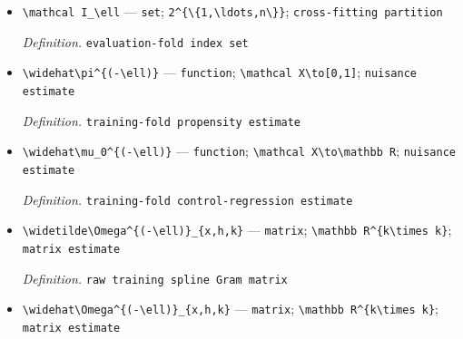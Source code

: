 \documentclass{article}
\begin{document}
\begin{itemize}
  \par\smallskip\noindent\emph{Definition.} \texttt{fold index}
  \item \texttt{\textbackslash{}\allowbreak{}mathcal I\_\allowbreak{}\textbackslash{}\allowbreak{}ell} --- \texttt{set}; \texttt{2\textasciicircum{}\{\textbackslash{}\allowbreak{}\{1,\allowbreak{}\textbackslash{}\allowbreak{}ldots,\allowbreak{}n\textbackslash{}\allowbreak{}\}\allowbreak{}\}\allowbreak{}}; \texttt{cross-\allowbreak{}fitting partition}
  \par\smallskip\noindent\emph{Definition.} \texttt{evaluation-\allowbreak{}fold index set}
  \item \texttt{\textbackslash{}\allowbreak{}widehat\textbackslash{}\allowbreak{}pi\textasciicircum{}\{(-\allowbreak{}\textbackslash{}\allowbreak{}ell)\}\allowbreak{}} --- \texttt{function}; \texttt{\textbackslash{}\allowbreak{}mathcal X\textbackslash{}\allowbreak{}to[0,\allowbreak{}1]}; \texttt{nuisance estimate}
  \par\smallskip\noindent\emph{Definition.} \texttt{training-\allowbreak{}fold propensity estimate}
  \item \texttt{\textbackslash{}\allowbreak{}widehat\textbackslash{}\allowbreak{}mu\_\allowbreak{}0\textasciicircum{}\{(-\allowbreak{}\textbackslash{}\allowbreak{}ell)\}\allowbreak{}} --- \texttt{function}; \texttt{\textbackslash{}\allowbreak{}mathcal X\textbackslash{}\allowbreak{}to\textbackslash{}\allowbreak{}mathbb R}; \texttt{nuisance estimate}
  \par\smallskip\noindent\emph{Definition.} \texttt{training-\allowbreak{}fold control-\allowbreak{}regression estimate}
  \item \texttt{\textbackslash{}\allowbreak{}widetilde\textbackslash{}\allowbreak{}Omega\textasciicircum{}\{(-\allowbreak{}\textbackslash{}\allowbreak{}ell)\}\allowbreak{}\_\allowbreak{}\{x,\allowbreak{}h,\allowbreak{}k\}\allowbreak{}} --- \texttt{matrix}; \texttt{\textbackslash{}\allowbreak{}mathbb R\textasciicircum{}\{k\textbackslash{}\allowbreak{}times k\}\allowbreak{}}; \texttt{matrix estimate}
  \par\smallskip\noindent\emph{Definition.} \texttt{raw training spline Gram matrix}
  \item \texttt{\textbackslash{}\allowbreak{}widehat\textbackslash{}\allowbreak{}Omega\textasciicircum{}\{(-\allowbreak{}\textbackslash{}\allowbreak{}ell)\}\allowbreak{}\_\allowbreak{}\{x,\allowbreak{}h,\allowbreak{}k\}\allowbreak{}} --- \texttt{matrix}; \texttt{\textbackslash{}\allowbreak{}mathbb R\textasciicircum{}\{k\textbackslash{}\allowbreak{}times k\}\allowbreak{}}; \texttt{matrix estimate}

\end{itemize}
\end{document}
